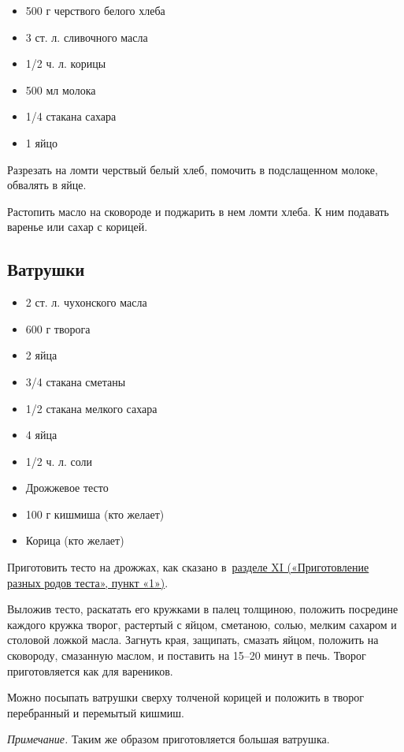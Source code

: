 \begin{itemize}
	\item 500 г черствого белого хлеба 
    \item 3 ст. л. сливочного масла
    \item 1/2 ч. л. корицы
    \item 500 мл молока
    \item 1/4 стакана сахара
    \item 1 яйцо
\end{itemize}

Разрезать на ломти черствый белый хлеб, помочить в подслащенном молоке, обвалять в яйце.

Растопить масло на сковороде и поджарить в нем ломти хлеба. К ним подавать варенье или сахар с корицей.

\subsection{Ватрушки}

\begin{itemize}
	\item 2 ст. л. чухонского масла 
    \item 600 г творога 
    \item 2 яйца 
    \item 3/4 стакана сметаны 
    \item 1/2 стакана мелкого сахара
    \item 4 яйца
    \item 1/2 ч. л. соли
    \item Дрожжевое тесто
    \item 100 г кишмиша (кто желает)
    \item Корица (кто желает)
\end{itemize}

Приготовить тесто на дрожжах, как сказано в~\hyperref[sub:drozhzhevoje]{разделе XI («Приготовление разных родов теста», пункт «1»)}.

Выложив тесто, раскатать его кружками в палец толщиною, положить посредине каждого кружка творог, растертый с яйцом, сметаною, солью, мелким сахаром и столовой ложкой масла. Загнуть края, защипать, смазать яйцом, положить на сковороду, смазанную маслом, и поставить на 15–20 минут в печь. Творог приготовляется как для вареников.

Можно посыпать ватрушки сверху толченой корицей и положить в творог перебранный и перемытый кишмиш.

\emph{Примечание.} Таким же образом приготовляется большая ватрушка.

